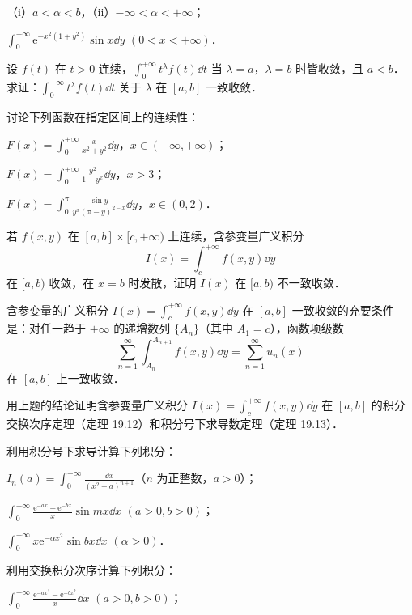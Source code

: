\begin{xiti}
\begin{ziti}
（i）$a<\alpha<b$，（ii）$-\infty<\alpha<+\infty$；
\item $\displaystyle\int_{0}^{+\infty}\mathrm{e}^{-x^{2}(1+y^{2})}\sin x\dd y$ $(0<x<+\infty)$．
\end{ziti}
\item 设 $f(t)$ 在 $t>0$ 连续，$\displaystyle\int_{0}^{+\infty}t^{\lambda}f(t)\dd t$ 当 $\lambda=a$，$\lambda=b$ 时皆收敛，且 $a<b$．求证：$\displaystyle\int_{0}^{+\infty}t^{\lambda}f(t)\dd t$ 关于 $\lambda$ 在 $[a,b]$ 一致收敛．
\item 讨论下列函数在指定区间上的连续性：
\begin{ziti}
\item $F(x)=\displaystyle\int_{0}^{+\infty}\frac{x}{x^{2}+y^{2}}\dd y$，$x\in(-\infty,+\infty)$；
\item $F(x)=\displaystyle\int_{0}^{+\infty}\frac{y^{2}}{1+y^{x}}\dd y$，$x>3$；
\item $F(x)=\displaystyle\int_{0}^{\pi}\frac{\sin y}{y^{x}(\pi-y)^{2-x}}\dd y$，$x\in(0,2)$．
\end{ziti}
\item 若 $f(x,y)$ 在 $[a,b]\times[c,+\infty)$ 上连续，含参变量广义积分
\[
I(x)=\int_{c}^{+\infty}f(x,y)\dd y
\]
在 $[a,b)$ 收敛，在 $x=b$ 时发散，证明 $I(x)$ 在 $[a,b)$ 不一致收敛．
\item 含参变量的广义积分 $\displaystyle I(x)=\int_{c}^{+\infty}f(x,y)\dd y$ 在 $[a,b]$ 一致收敛的充要条件是：对任一趋于 $+\infty$ 的递增数列 $\{A_{n}\}$（其中 $A_{1}=c$），函数项级数
\[
\sum_{n=1}^{\infty}\int_{A_{n}}^{A_{n+1}}f(x,y)\dd y=\sum_{n=1}^{\infty}u_{n}(x)
\]
在 $[a,b]$ 上一致收敛．
\item 用上题的结论证明含参变量广义积分 $\displaystyle I(x)=\int_{c}^{+\infty}f(x,y)\dd y$ 在 $[a,b]$ 的积分交换次序定理（定理 19.12）和积分号下求导数定理（定理 19.13）．
\item 利用积分号下求导计算下列积分：
\begin{ziti}
\item $I_{n}(a)=\displaystyle\int_{0}^{+\infty}\frac{\dd x}{(x^{2}+a)^{n+1}}$（$n$ 为正整数，$a>0$）；
\item $\displaystyle\int_{0}^{+\infty}\frac{\mathrm{e}^{-ax}-\mathrm{e}^{-bx}}{x}\sin mx\dd x$ $(a>0,b>0)$；
\item $\displaystyle\int_{0}^{+\infty}x\mathrm{e}^{-\alpha x^{2}}\sin bx\dd x$ $(\alpha>0)$．
\end{ziti}
\item 利用交换积分次序计算下列积分：
\begin{ziti}
\item $\displaystyle\int_{0}^{+\infty}\frac{\mathrm{e}^{-ax^{2}}-\mathrm{e}^{-bx^{2}}}{x}\dd x$ $(a>0,b>0)$；

\end{ziti}
\end{xiti}
